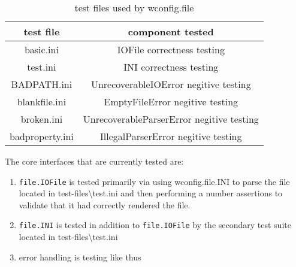 \documentclass{article}
\newcommand{\monospaced}[1]{\colorbox{light-gray}{\texttt{#1}}}
\begin{document}
\begin{table}[h!]
\centering
\begin{tabular}{||c c||} 
\hline
test file & component tested \\ [0.5ex] 
\hline\hline
basic.ini & IOFile correctness testing \\
test.ini & INI correctness testing \\ 
BADPATH.ini & UnrecoverableIOError negitive testing \\ 
blankfile.ini & EmptyFileError negitive testing \\ 
broken.ini & UnrecoverableParserError negitive testing \\ 
badproperty.ini & IllegalParserError negitive testing \\ 
\hline
\end{tabular}
\caption{test files used by wconfig.file}
\label{table:1}
\end{table}

The core interfaces that are currently tested are:
\begin{enumerate}
\item \monospaced{file.IOFile} is tested primarily via using wconfig.file.INI to parse the file located in test-files\textbackslash test.ini and then performing a number assertions to validate that it had correctly rendered the file.
\item \monospaced{file.INI} is tested in addition to \monospaced{file.IOFile} by the secondary test suite located in test-files\textbackslash test.ini
\item error handling is testing like thus
\end{enumerate}

\end{document}
